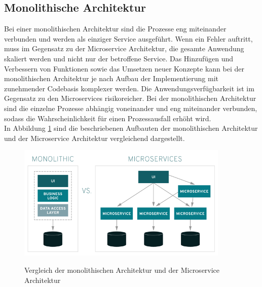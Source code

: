 \subsection{Monolithische Architektur}
Bei einer monolithischen Architektur sind die Prozesse eng miteinander verbunden und werden als einziger Service ausgeführt. Wenn ein Fehler auftritt, muss im Gegensatz zu der Microservice Architektur, die gesamte Anwendung skaliert werden und nicht nur der betroffene Service. Das Hinzufügen und Verbessern von Funktionen sowie das Umsetzen neuer Konzepte kann bei der monolithischen Architektur je nach Aufbau der Implementierung mit zunehmender Codebasis komplexer werden. Die Anwendungsverfügbarkeit ist im Gegensatz zu den Microservices risikoreicher. Bei der monolithischen Architektur sind die einzelne Prozesse abhängig voneinander und eng miteinander verbunden, sodass die Wahrscheinlichkeit für einen Prozessausfall erhöht wird.\\
In Abbildung \ref{mono} sind die beschriebenen Aufbauten der monolithischen Architektur und der Microservice Architektur vergleichend dargestellt.
\begin{figure}[bth] 
	\centering
	\includegraphics[width=0.9\textwidth]{Graphics/monoVsMicro.png}
	\caption{Vergleich der monolithischen Architektur und der Microservice Architektur}
	\label{mono}
	\cite{microBild}
\end{figure}\\
